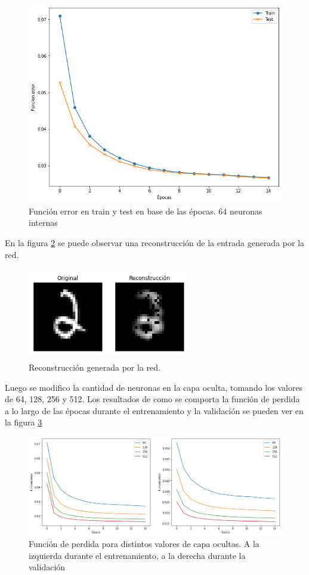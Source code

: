 \documentclass{article}
\begin{document}
\begin{figure}[H]
\centering
\includegraphics[width=\textwidth]{Train-vs-test.png}
\caption{Función error en train y test en base de las épocas. 64 neuronas internas }
\label{fig1}
\end{figure}

En la figura \ref{fig3} se puede observar una reconstrucción de la entrada generada por la red.

\begin{figure}[H]
\centering
\includegraphics[width=7cm, height=4cm]{examples2.png}
\caption{Reconstrucción generada por la red. }
\label{fig3}
\end{figure}

Luego se modifico la cantidad de neuronas en la capa oculta, tomando los valores de 64, 128, 256 y 512. Los resultados de como se comporta la función de perdida a lo largo de las épocas durante el entrenamiento y la validación se pueden ver en la figura \ref{fig5}

\begin{figure}[H]
\centering
\includegraphics[width=\textwidth]{graficoDiferente.png}
\caption{Función de perdida para distintos valores de capa ocultas. A la izquierda durante el entrenamiento, a la derecha durante la validación }
\label{fig5}
\end{figure}
\end{document}
